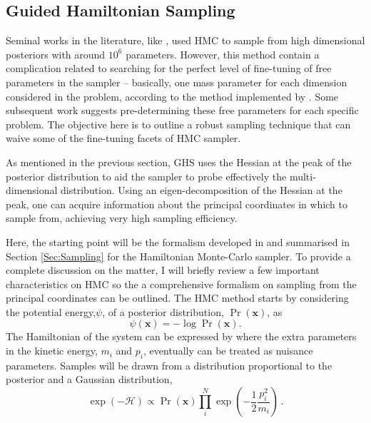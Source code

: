 \subsection{Guided Hamiltonian Sampling}\label{Sec:BPL:GHS}
Seminal works in the literature, like \cite{Hanson2001,Taylor2008}, used HMC to sample from high dimensional posteriors with around $10^6$ parameters. However, this method contain a complication related to searching for the perfect level of fine-tuning of free parameters in the sampler -- basically, one mass parameter for each dimension considered in the problem, according to the method implemented by \cite{Taylor2008}. Some subsequent work suggests pre-determining these free parameters for each specific problem. The objective here is to outline a robust sampling technique that can waive some of the fine-tuning facets of HMC sampler.

\qquad As mentioned in the previous section, GHS uses the Hessian at the peak of the posterior distribution to aid the sampler to probe effectively the multi-dimensional distribution. Using an eigen-decomposition of the Hessian at the peak, one can acquire information about the principal coordinates in which to sample from, achieving very high sampling efficiency.

\qquad Here, the starting point will be the formalism developed in \cite{Taylor2008,2013-GuidedHamiltonian} and summarised in Section \ref{Sec:Sampling} for the Hamiltonian Monte-Carlo sampler. To provide a complete discussion on the matter, I will briefly review a few important characteristics on HMC so the a comprehensive formalism on sampling from the principal coordinates can be outlined. The HMC method starts by considering the potential energy,$\psi$, of a posterior distribution, $\Pr(\bm{x})$, as
\begin{equation}
\label{eqn::ch1_log_post}
\psi(\mathbf{x})=-\log\Pr(\mathbf{x}).
\end{equation}
The Hamiltonian of the system can be expressed by
where the extra parameters in the kinetic energy, $m_i$ and $p_i$, eventually can  be treated as nuisance parameters. Samples will be drawn from a distribution proportional to the posterior and a Gaussian distribution,
\begin{equation}
\label{EQ:BPL:HMC_ExpH}
\exp(-\mathcal{H})\propto \Pr(\bm{x})\prod_i^N\exp\left(-\frac{1}{2}\frac{p_i^2}{m_i}\right)\, .
\end{equation}

